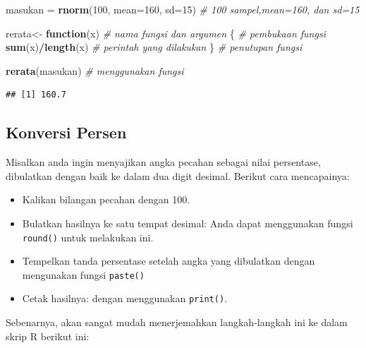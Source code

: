 \documentclass[
]{book}
\newenvironment{Shaded}{\begin{snugshade}}{\end{snugshade}}
\newcommand{\AttributeTok}[1]{\textcolor[rgb]{0.13,0.29,0.53}{#1}}
\newcommand{\CommentTok}[1]{\textcolor[rgb]{0.56,0.35,0.01}{\textit{#1}}}
\newcommand{\ControlFlowTok}[1]{\textcolor[rgb]{0.13,0.29,0.53}{\textbf{#1}}}
\newcommand{\DecValTok}[1]{\textcolor[rgb]{0.00,0.00,0.81}{#1}}
\newcommand{\FunctionTok}[1]{\textcolor[rgb]{0.13,0.29,0.53}{\textbf{#1}}}
\newcommand{\NormalTok}[1]{#1}
\newcommand{\OtherTok}[1]{\textcolor[rgb]{0.56,0.35,0.01}{#1}}
\newcommand{\SpecialCharTok}[1]{\textcolor[rgb]{0.81,0.36,0.00}{\textbf{#1}}}
\providecommand{\tightlist}{%
  \setlength{\itemsep}{0pt}\setlength{\parskip}{0pt}}
\begin{document}
\begin{Shaded}
\begin{Highlighting}[]
\NormalTok{masukan }\OtherTok{=} \FunctionTok{rnorm}\NormalTok{(}\DecValTok{100}\NormalTok{, }\AttributeTok{mean=}\DecValTok{160}\NormalTok{, }\AttributeTok{sd=}\DecValTok{15}\NormalTok{)        }\CommentTok{\# 100 sampel,mean=160, dan sd=15 }

\NormalTok{rerata}\OtherTok{\textless{}{-}} \ControlFlowTok{function}\NormalTok{(x)                         }\CommentTok{\# nama fungsi dan argumen   }
\NormalTok{\{                                            }\CommentTok{\# pembukaan fungsi}
  \FunctionTok{sum}\NormalTok{(x)}\SpecialCharTok{/}\FunctionTok{length}\NormalTok{(x)                           }\CommentTok{\# perintah yang dilakukan }
\NormalTok{\}                                            }\CommentTok{\# penutupan fungsi}

\FunctionTok{rerata}\NormalTok{(masukan)                              }\CommentTok{\# menggunakan fungsi}
\end{Highlighting}
\end{Shaded}

\begin{verbatim}
## [1] 160.7
\end{verbatim}

\hypertarget{konversi-persen}{%
\subsection{Konversi Persen}\label{konversi-persen}}

Misalkan anda ingin menyajikan angka pecahan sebagai nilai persentase, dibulatkan dengan baik ke dalam dua digit desimal. Berikut cara mencapainya:

\begin{itemize}
\tightlist
\item
  Kalikan bilangan pecahan dengan 100.
\item
  Bulatkan hasilnya ke satu tempat desimal: Anda dapat menggunakan fungsi \texttt{round()} untuk melakukan ini.
\item
  Tempelkan tanda persentase setelah angka yang dibulatkan dengan mengunakan fungsi \texttt{paste()}
\item
  Cetak hasilnya: dengan menggunakan \texttt{print()}.
\end{itemize}

Sebenarnya, akan sangat mudah menerjemahkan langkah-langkah ini ke dalam skrip R berikut ini:
\end{document}
